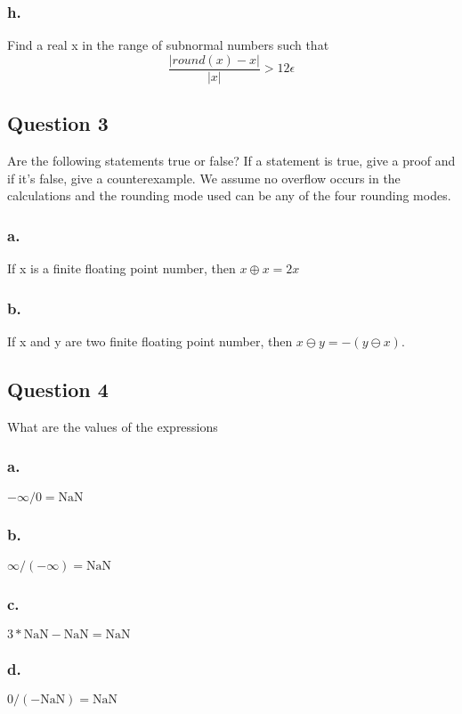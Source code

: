 \documentclass[12pt,a4paper]{article}
\begin{document}
\subsubsection*{h.}
 Find a real x
 in the range of subnormal numbers such that
$$\frac{|round(x)-x|}{|x|}>12 \epsilon$$
\vfill
\newpage

\subsection*{Question 3}

Are the following statements true or false? If a statement is true, give a proof and if it's false, give a counterexample. We assume no overflow occurs in the calculations and the rounding mode used can be any of the four rounding modes.

\subsubsection*{a.} 
If x is a finite floating point number, then $x \oplus x =2x$

\subsubsection*{b.} 
 If x and y are two finite floating point number, then $x\ominus y=-(y\ominus x)$.

\vfill
\newpage

\subsection*{Question 4}

What are the values of the expressions 
\subsubsection*{a.} $-\infty/0 = \mathrm{NaN}$ 
\subsubsection*{b.} $\infty/(-\infty) = \mathrm{NaN}$
\subsubsection*{c.} $3* \mathrm{NaN} - \mathrm{NaN} = \mathrm{NaN}$
\subsubsection*{d.} $0/(- \mathrm{NaN}) = \mathrm{NaN}$
\vfill
\newpage
\end{document}
